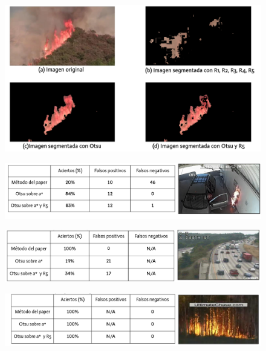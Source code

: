 \documentclass[a4paper]{article}
\begin{document}
 
\begin{figure}[H]
    \centering
    \includegraphics[width=1\linewidth]{figures/exp_img.png}
\end{figure}

\begin{figure}[H]
    \centering
    \includegraphics[width=1\linewidth]{figures/exp_video_1.png}
    \label{fig:exp_video_1}
\end{figure}
 

\begin{figure}[H]
    \centering
    \includegraphics[width=1\linewidth]{figures/exp_video_2.png}
\end{figure}
 

\begin{figure}[H]
    \centering
    \includegraphics[width=1\linewidth]{figures/exp_video_3.png}
    \label{fig:exp_video_3}
\end{figure}
 
\end{document}
